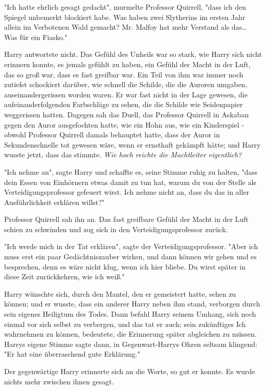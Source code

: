 {"Ich hatte ehrlich gesagt gedacht", murmelte Professor Quirrell, "dass ich den Spiegel unbemerkt blockiert habe. Was haben zwei Slytherins im ersten Jahr allein im Verbotenen Wald gemacht? Mr. Malfoy hat mehr Verstand als das… Was für ein Fiasko."

Harry antwortete nicht. Das Gefühl des Unheils war so stark, wie Harry sich nicht erinnern konnte, es jemals gefühlt zu haben, ein Gefühl der Macht in der Luft, das so groß war, dass es fast greifbar war. Ein Teil von ihm war immer noch zutiefst schockiert darüber, wie schnell die Schilde, die die Auroren umgaben, auseinandergerissen worden waren. Er war fast nicht in der Lage gewesen, die aufeinanderfolgenden Farbschläge zu sehen, die die Schilde wie Seidenpapier weggerissen hatten. Dagegen sah das Duell, das Professor Quirrell in Askaban gegen den Auror ausgefochten hatte, wie ein Hohn aus, wie ein Kinderspiel - obwohl Professor Quirrell damals behauptet hatte, dass der Auror in Sekundenschnelle tot gewesen wäre, wenn er ernsthaft gekämpft hätte; und Harry wusste jetzt, dass das stimmte. \emph{Wie hoch reichte die Machtleiter eigentlich?}

"Ich nehme an", sagte Harry und schaffte es, seine Stimme ruhig zu halten, "dass dein Essen von Einhörnern etwas damit zu tun hat, warum du von der Stelle als Verteidigungsprofessor gefeuert wirst. Ich nehme nicht an, dass du das in aller Ausführlichkeit erklären willst?"

Professor Quirrell sah ihn an. Das fast greifbare Gefühl der Macht in der Luft schien zu schwinden und zog sich in den Verteidigungsprofessor zurück.

"Ich werde mich in der Tat erklären", sagte der Verteidigungsprofessor. "Aber ich muss erst ein paar Gedächtniszauber wirken, und dann können wir gehen und es besprechen, denn es wäre nicht klug, wenn ich hier bliebe. Du wirst später in diese Zeit zurückkehren, wie ich weiß."

Harry wünschte sich, durch den Mantel, den er gemeistert hatte, sehen zu können; und er wusste, dass ein anderer Harry neben ihm stand, verborgen durch sein eigenes Heiligtum des Todes. Dann befahl Harry seinem Umhang, sich noch einmal vor sich selbst zu verbergen, und das tat er auch; sein zukünftiges Ich wahrnehmen zu können, bedeutete, die Erinnerung später abgleichen zu müssen. Harrys eigene Stimme sagte dann, in Gegenwart-Harrys Ohren seltsam klingend: "Er hat eine überraschend gute Erklärung."

Der gegenwärtige Harry erinnerte sich an die Worte, so gut er konnte. Es wurde nichts mehr zwischen ihnen gesagt.

}
